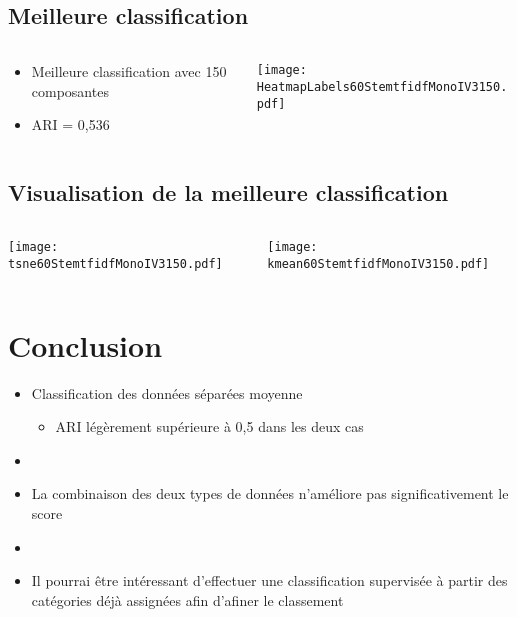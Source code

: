 \documentclass[8pt,aspectratio=169,hyperref={unicode=true}]{beamer}
\begin{document}
\subsection{Meilleure classification}
\begin{frame}{\insertsubsection}
    \begin{columns}
        \begin{column}{.4\textwidth}
            \begin{itemize}
                \item Meilleure classification avec 150 composantes
                \item ARI = 0,536
            \end{itemize}
        \end{column}
        \begin{column}{.6\textwidth}
            \texttt{[image: HeatmapLabels60StemtfidfMonoIV3150.pdf]}
        \end{column}
    \end{columns}
\end{frame}

\subsection{Visualisation de la meilleure classification}
\begin{frame}{\insertsubsection}
    \begin{columns}
        \begin{column}{.5\textwidth}
            \texttt{[image: tsne60StemtfidfMonoIV3150.pdf]}
        \end{column}
        \begin{column}{.5\textwidth}
            \texttt{[image: kmean60StemtfidfMonoIV3150.pdf]}
        \end{column}
    \end{columns}
\end{frame}

\section{Conclusion}
\begin{frame}
    \begin{itemize}
        \item Classification des données séparées moyenne
              \begin{itemize}
                  \item ARI légèrement supérieure à 0,5 dans les deux cas
              \end{itemize}
        \item[]
        \item La combinaison des deux types de données n'améliore pas significativement le score
        \item[]
        \item Il pourrai être intéressant d'effectuer une classification supervisée à partir des catégories déjà assignées afin d'afiner le classement 
    \end{itemize}
\end{frame}
\end{document}
